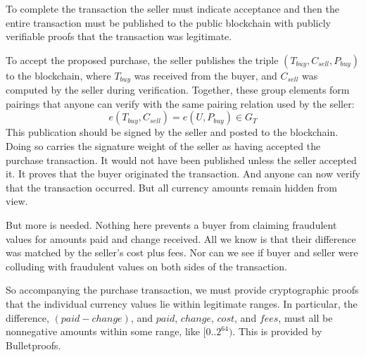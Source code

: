 To complete the transaction the seller must indicate acceptance and then the entire transaction must be published to the public blockchain with publicly verifiable proofs that the transaction was legitimate. 

To accept the proposed purchase, the seller publishes the triple $(T_{buy}, C_{sell}, P_{buy})$ to the blockchain, where $T_{buy}$ was received from the buyer, and $C_{sell}$ was computed by the seller during verification. Together, these group elements form pairings that anyone can verify with the same pairing relation used by the seller:
$$ e(T_{buy},C_{sell}) = e(U,P_{buy}) \in G_T$$
This publication should be signed by the seller and posted to the blockchain. Doing so carries the signature weight of the seller as having accepted the purchase transaction. It would not have been published unless the seller accepted it. It proves that the buyer originated the transaction. And anyone can now verify that the transaction occurred. But all currency amounts remain hidden from view.

But more is needed. Nothing here prevents a buyer from claiming fraudulent values for amounts paid and change received. All we know is that their difference was matched by the seller's cost plus fees. Nor can we see if buyer and seller were colluding with fraudulent values on both sides of the transaction. 

So accompanying the purchase transaction, we must provide cryptographic proofs that the individual currency values lie within legitimate ranges. In particular, the difference, $(paid - change)$, and $paid$,  $change$, $cost$, and $fees$, must all be nonnegative amounts within some range, like $[0..2^{64})$.   This is provided by Bulletproofs. 

